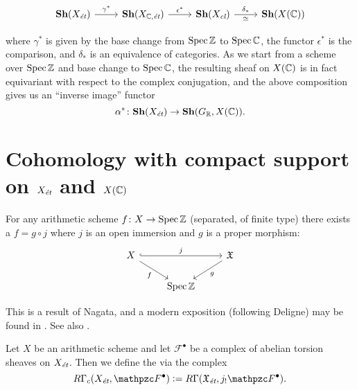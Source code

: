 \[ \begin{tikzcd}
    \categ{Sh} (X_\text{\it ét}) \ar{r}{\gamma^*} &
    \categ{Sh} (X_{\CC,\text{\it ét}}) \ar{r}{\epsilon^*} &
    \categ{Sh} (X_\text{\it cl}) \ar{r}{\delta_*}[swap]{\cequiv} &
    \categ{Sh} (X (\CC))
  \end{tikzcd} \]

\noindent where $\gamma^*$ is given by the base change from $\operatorname{Spec} \mathbb{Z}$ to
$\operatorname{Spec} \mathbb{C}$, the functor $\epsilon^*$ is the comparison, and $\delta_*$ is an
equivalence of categories. As we start from a scheme over $\operatorname{Spec} \mathbb{Z}$ and base
change to $\operatorname{Spec} \mathbb{C}$, the resulting sheaf on $X (\mathbb{C})$ is in fact equivariant
with respect to the complex conjugation, and the above composition gives us an
``inverse image'' functor
$$\alpha^*\colon \text{\bf Sh} (X_\text{\it ét}) \to \text{\bf Sh} (G_{\mathbb{R}}, X (\mathbb{C})).$$


\section{Cohomology with compact support on
  \texorpdfstring{$X_\text{\it ét}$}{X\_ét} and $X (\mathbb{C})$}
\label{section:cohomology-with-compact-support}

For any arithmetic scheme $f\colon X\to \operatorname{Spec} \mathbb{Z}$ (separated, of finite type)
there exists a  $f = g\circ j$ where $j$ is an
open immersion and $g$ is a proper morphism:
\[ \begin{tikzcd}
    X \ar[hookrightarrow]{rr}{j}\ar{dr}[swap]{f} & & \mathfrak{X} \ar{dl}{g} \\
    & \Spec \ZZ
  \end{tikzcd} \]

This is a result of Nagata, and a modern exposition (following Deligne) may be
found in \cite{Conrad-Deligne-Nagata,Conrad-Deligne-Nagata-erratum}. See also
\cite[Exposé XVII]{SGA4}.

\begin{definition}
  Let $X$ be an arithmetic scheme and let $\mathcal{F}^\bullet$ be a complex of
  abelian torsion sheaves on $X_\text{\it ét}$. Then we define the
   via the
  complex
  \begin{equation}
    \label{eqn:RGammac-via-extension-by-zero}
    R\Gamma_c (X_\text{\it ét}, \mathcal{F}^\bullet) \dfn
    R\Gamma (\mathfrak{X}_\text{\it \'et}, j_! \mathcal{F}^\bullet).
  \end{equation}
\end{definition}

